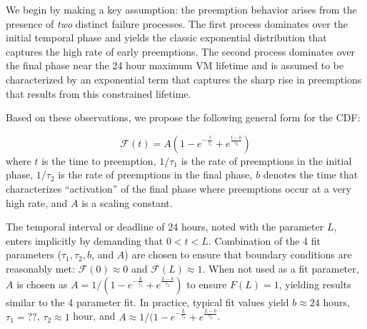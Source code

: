 We begin by making a key assumption: the preemption behavior arises from the presence of \emph{two} distinct failure processes.
The first process dominates over the initial temporal phase and yields the classic exponential distribution that captures the high rate of early preemptions.
The second process dominates over the final phase near the 24 hour maximum VM lifetime and is assumed to be characterized by an exponential term that captures the sharp rise in preemptions that results from this constrained lifetime. 

%
%

Based on these observations, we propose the following general form for the CDF:

\vspace*{\subsecspace}
\begin{equation}
  \label{eq:blend1}
  \boxed{
  \mathscr{F}\left(t\right) = A\left(1-e^{-\frac{t}{\tau_1}} + e^{\frac{t-b}{\tau_2}}\right)}
  \end{equation}
\noindent where $t$ is the time to preemption, $1/\tau_1$ is the rate of preemptions in the initial phase, $1/\tau_2$ is the rate of preemptions in the final phase, $b$ denotes the time that characterizes ``activation'' of the final phase where preemptions occur at a very high rate, and $A$ is a scaling constant. 

The temporal interval or deadline of 24 hours, noted with the parameter $L$, enters implicitly by demanding that $0 < t < L$. Combination of the 4 fit parameters ($\tau_1, \tau_2, b$, and $A$) are chosen to ensure that boundary conditions are reasonably met: $\mathscr{F}(0) \approx 0$ and $\mathscr{F}(L) \approx 1$. When not used as a fit parameter, $A$ is chosen as $A = 1/(1-e^{-\frac{L}{\tau_1}} + e^{\frac{L-b}{\tau_2}})$ to ensure $F(L) = 1$, yielding results similar to the 4 parameter fit. 
In practice, typical fit values yield $b \approx 24$ hours, $\tau_1 = ??$, $\tau_2 \approx 1$ hour, and $A \approx 1/(1-e^{-\frac{L}{\tau_1}} + e^{\frac{L-b}{\tau_2}}$.  

